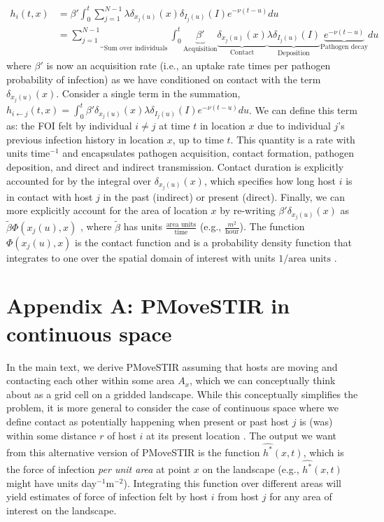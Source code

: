 \documentclass[11pt]{article}
\begin{document}
\begin{equation}
    \begin{aligned}
    h_i(t, x) &= \beta' \int_{0}^{t} \sum_{j = 1}^{N - 1} \lambda \delta_{x_j(u)}(x) \delta_{I_j(u)}(I) e^{-\nu(t - u)} du \\ &=  \underbrace{\sum_{j = 1}^{N - 1}}_{\text{Sum over individuals}} \int_{0}^{t} \underbrace{\beta'}_{\text{Acquisition}} \underbrace{\delta_{x_j(u)}(x)}_{\text{Contact}} \underbrace{\lambda \delta_{I_j(u)}(I)}_{\text{Deposition}} \underbrace{e^{-\nu(t - u)}}_{\text{Pathogen decay}} du
    \end{aligned}
    \label{eq:h_partitioned}
\end{equation}
where $\beta'$ is now an acquisition rate (i.e., an uptake rate times per pathogen probability of infection) as we have conditioned on contact with the term $\delta_{x_j(u)}(x)$.  Consider a single term in the summation, $h_{i \leftarrow j}(t, x) = \int_{0}^{t} \beta' \delta_{x_j(u)}(x) \lambda \delta_{I_j(u)}(I) e^{-\nu(t - u)} du$. We can define this term as: the FOI felt by individual $i \neq j$ at time $t$ in location $x$ due to individual $j$'s previous infection history in location $x$, up to time $t$. This quantity is a rate with units time$^{-1}$ and encapsulates pathogen acquisition, contact formation, pathogen deposition, and direct and indirect transmission. Contact duration is explicitly accounted for by the integral over $\delta_{x_j(u)}(x)$, which specifies how long host $i$ is in contact with host $j$ in the past (indirect) or present (direct). Finally, we can more explicitly account for the area of location $x$ by re-writing $\beta' \delta_{x_j(u)}(x)$ as $\tilde{\beta} \Phi(x_j(u), x)$ \citep{Gurarie2013,Martinez-Garcia2020}, where $\tilde{\beta}$ has units $\frac{\text{area units}}{\text{time}}$ (e.g., $\frac{m^2}{\text{hour}}$).  The function $\Phi(x_j(u), x)$ is the contact function and is a probability density function that integrates to one over the spatial domain of interest with units $1 / \text{area units}$ \citep[Appendix S1;][]{Gurarie2013}.

\section*{Appendix A: PMoveSTIR in continuous space}

In the main text, we derive PMoveSTIR assuming that hosts are moving and contacting each other within some area $A_x$, which we can conceptually think about as a grid cell on a gridded landscape.  While this conceptually simplifies the problem, it is more general to consider the case of continuous space where we define contact as potentially happening when present or past host $j$ is (was) within some distance $r$ of host $i$ at its present location \citep{Wilber2022}.  The output we want from this alternative version of PMoveSTIR is the function $\hat{h^*}(x, t)$, which is the force of infection \emph{per unit area} at point $x$ on the landscape (e.g., $\hat{h^*}(x, t)$ might have units day$^{-1}\text{m}^{-2}$).  Integrating this function over different areas will yield estimates of force of infection felt by host $i$ from host $j$ for any area of interest on the landscape.
\end{document}
